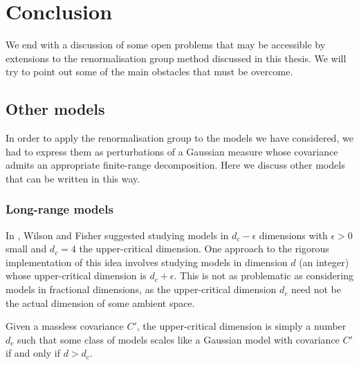 \chapter{Conclusion}

\setcounter{footnote}{0}

We end with a discussion of some open problems that may be accessible by
extensions to the renormalisation group method discussed in this thesis.
We will try to point out some of the main obstacles that must be overcome.


\section{Other models}

In order to apply the renormalisation group to the models we have considered,
we had to express them as perturbations of a Gaussian measure whose covariance
admits an appropriate finite-range decomposition. Here we discuss other models
that can be written in this way.


\subsection{Long-range models}

In \cite{WF72}, Wilson and Fisher suggested studying models in $d_c - \epsilon$
dimensions with $\epsilon > 0$ small and $d_c = 4$ the upper-critical dimension.
One approach to the rigorous implementation of this idea
involves studying models in dimension $d$ (an integer) whose upper-critical
dimension is $d_c + \epsilon$. This is not as problematic as considering
models in fractional dimensions, as the upper-critical dimension $d_c$ need not
be the actual dimension of some ambient space.

Given a massless covariance $C'$, the upper-critical
dimension is simply a number $d_c$ such that some class of models scales like a
Gaussian model with covariance $C'$ if and only if $d > d_c$.


